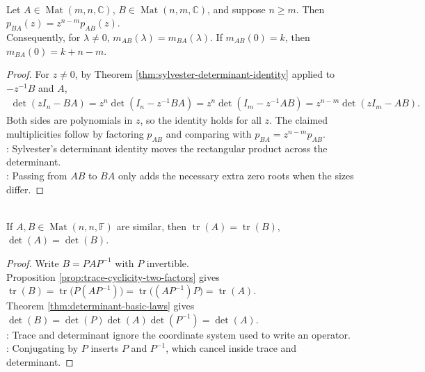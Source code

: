 \begin{theorem} \label{thm:ab-ba-nonzero-eigenvalues} \\
Let $A\in\operatorname{Mat}(m,n,\mathbb{C})$, $B\in\operatorname{Mat}(n,m,\mathbb{C})$, and suppose $n\geq m$. Then $p_{BA}(z)=z^{n-m}p_{AB}(z)$.\\
Consequently, for $\lambda\neq0$, $m_{AB}(\lambda)=m_{BA}(\lambda)$. If $m_{AB}(0)=k$, then $m_{BA}(0)=k+n-m$.
\begin{proof}
For $z\neq0$, by Theorem \ref{thm:sylvester-determinant-identity} applied to $-z^{-1}B$ and $A$,
\begin{align}
\det(zI_n-BA) =z^n\det(I_n-z^{-1}BA) =z^n\det(I_m-z^{-1}AB) =z^{n-m}\det(zI_m-AB).
\nonumber
\end{align}
Both sides are polynomials in $z$, so the identity holds for all $z$. The claimed multiplicities follow by factoring $p_{AB}$ and comparing with $p_{BA}=z^{n-m}p_{AB}$.\\
: Sylvester's determinant identity moves the rectangular product across the determinant.\\
: Passing from $AB$ to $BA$ only adds the necessary extra zero roots when the sizes differ.
\end{proof}
\end{theorem}

\begin{theorem} \label{thm:similarity-preserves-trace-and-determinant} \\
If $A,B\in\operatorname{Mat}(n,n,\mathbb{F})$ are similar, then $\operatorname{tr}(A)=\operatorname{tr}(B)$, $\det(A)=\det(B)$.
\begin{proof}
Write $B=PAP^{-1}$ with $P$ invertible.\\
Proposition \ref{prop:trace-cyclicity-two-factors} gives $\operatorname{tr}(B)=\operatorname{tr}\bigl(P(AP^{-1})\bigr) =\operatorname{tr}\bigl((AP^{-1})P\bigr) =\operatorname{tr}(A)$.\\
Theorem \ref{thm:determinant-basic-laws} gives $\det(B)=\det(P)\det(A)\det(P^{-1})=\det(A)$.\\
: Trace and determinant ignore the coordinate system used to write an operator.\\
: Conjugating by $P$ inserts $P$ and $P^{-1}$, which cancel inside trace and determinant.
\end{proof}
\end{theorem}


